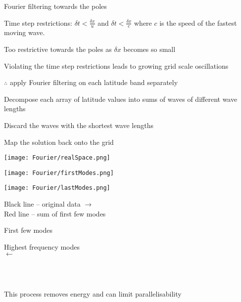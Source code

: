 \begin{slide}

\begin{list1}
\item Fourier filtering towards the poles
\begin{list2}
    \item Time step restrictions: $\delta t < \frac{\delta x}{u}$ and $\delta t < \frac{\delta x}{c}$ where $c$ is the speed of the fastest moving wave.
    \item Too restrictive towards the poles as $\delta x$ becomes so small
    \item Violating the time step restrictions leads to growing grid scale oscillations
    \item $\therefore$ apply Fourier filtering on each latitude band separately
    \begin{list0}
        \item Decompose each array of latitude values into sums of waves of different wave lengths
        \item Discard the waves with the shortest wave lengths
        \item Map the solution back onto the grid
    \end{list0}

\begin{minipage}{0.32\linewidth}
\texttt{[image: Fourier/realSpace.png]}
\end{minipage}
%
\begin{minipage}{0.32\linewidth}
\texttt{[image: Fourier/firstModes.png]}
\end{minipage}
%
\begin{minipage}{0.32\linewidth}
\texttt{[image: Fourier/lastModes.png]}
\end{minipage}

\begin{minipage}[t]{0.38\linewidth}\centering
Black line -- original data $\rightarrow$ \\
Red line -- sum of first few modes
\end{minipage}
%
\begin{minipage}[t]{0.23\linewidth}\centering
First few modes
\end{minipage}
%
\begin{minipage}[t]{0.37\linewidth}\centering
Highest frequency modes \\
$\longleftarrow$
\end{minipage}
\\ \ \\
    \item This process removes energy and can limit parallelisability
\end{list2}
\end{list1}
\end{slide}


